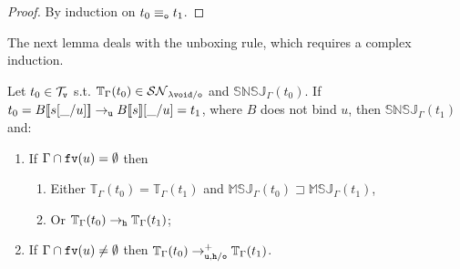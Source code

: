 \documentclass{LMCS}
\renewcommand{\>}{\rightarrow}
\def\lam{\lambda}
\def\Gam{\Gamma}
\newcommand{\Rew}[1]{\rightarrow_{#1}}
\newcommand{\SN}[1]{\mathcal{SN}_{#1}}
\newcommand{\Rewplus}[1]{\rightarrow^{+}_{#1}}
\newcommand{\fv}[1]{{\tt fv}(#1)}
\newcommand{\ems}{\emptyset}
\newcommand{\termsv}{\mathcal{T}_{\tt v}}
\newcommand{\unboxed}{{\tt u}}
\newcommand{\modulo}[2]{#1/#2}
\newcommand{\eqo}{\equiv_\osym}
\newcommand{\osym}{{\tt o}}
\newcommand{\osymb}{{\tt o}}
\newcommand{\aux}{{\tt void}}
\newcommand{\lauxm}{\lam\modulo{ \aux }{ \osymb }}
\newcommand{\New}{{\tt h}}
\newcommand{\snsudd}[2]{\mathbb{SNSJ}_{#1}(#2)}
\newcommand{\ctx}[2]{#1 [ \! [#2] \! ]}
\newcommand{\etamd}[2]{\mathbb{MSJ}_{#1}(#2)}
\newcommand{\surf}[2]{\mathbb{T}_{#1}(#2)}
\newcommand{\void}{\_}
\newcommand{\gm}{\sqsupset}
\begin{document}
\begin{proof}
By induction on $t_0\eqo t_1$.
\end{proof}

The next lemma deals with the unboxing rule, which requires a complex induction.

\begin{lem}
\label{l:lauxmes-red-unb2}
Let $t_0 \in \termsv$ s.t.   $\surf{\Gam}{t_0} \in  \SN{\lauxm}$ and 
$\snsudd{\Gam}{t_0}$. If $t_0=\ctx{B}{s[\void/u]}\Rew{\unboxed} \ctx{B}{s}[\void/u]= t_1$, 
where $B$ does not bind $u$,  then $\snsudd{\Gam}{t_1}$ and: 
\begin{enumerate}[$\star$]
  \item If $\Gam\cap \fv{u}=\ems$ then 
  \begin{enumerate}[$-$]
  \item Either $\surf{\Gam}{t_0}=\surf{\Gam}{t_1}$ and $\etamd{\Gam}{t_0}
\gm \etamd{\Gam}{t_1}$,
  \item Or $\surf{\Gam}{t_0} \Rew{\New} \surf{\Gam}{t_1}$;
  \end{enumerate}
  
  \item If $\Gam\cap \fv{u}\neq \ems$ then
  $\surf{\Gam}{t_0} \Rewplus{\modulo{\unboxed, \New}{\osym}} \surf{\Gam}{t_1}$.
\end{enumerate}
\end{lem}
\end{document}
